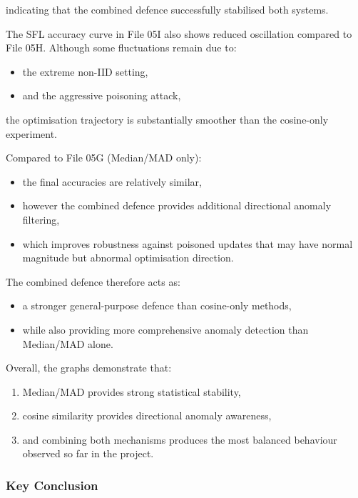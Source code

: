indicating that the combined defence successfully stabilised both systems.

The SFL accuracy curve in File 05I also shows reduced oscillation compared to File 05H. Although some fluctuations remain due to:
\begin{itemize}
    \item the extreme non-IID setting,
    \item and the aggressive poisoning attack,
\end{itemize}

the optimisation trajectory is substantially smoother than the cosine-only experiment.

Compared to File 05G (Median/MAD only):
\begin{itemize}
    \item the final accuracies are relatively similar,
    \item however the combined defence provides additional directional anomaly filtering,
    \item which improves robustness against poisoned updates that may have normal magnitude but abnormal optimisation direction.
\end{itemize}

The combined defence therefore acts as:
\begin{itemize}
    \item a stronger general-purpose defence than cosine-only methods,
    \item while also providing more comprehensive anomaly detection than Median/MAD alone.
\end{itemize}

Overall, the graphs demonstrate that:
\begin{enumerate}
    \item Median/MAD provides strong statistical stability,
    \item cosine similarity provides directional anomaly awareness,
    \item and combining both mechanisms produces the most balanced behaviour observed so far in the project.
\end{enumerate}

\subsubsection*{Key Conclusion}

